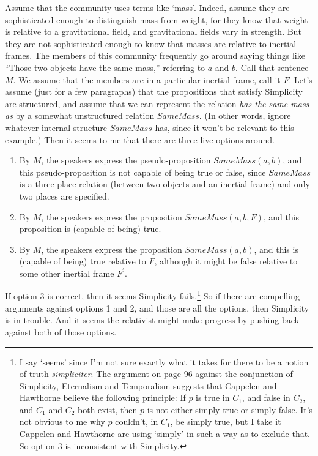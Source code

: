 Assume that the community uses terms like `mass'. Indeed, assume they are sophisticated enough to distinguish mass from weight, for they know that weight is relative to a gravitational field, and gravitational fields vary in strength. But they are not sophisticated enough to know that masses are relative to inertial frames. The members of this community frequently go around saying things like ``Those two objects have the same mass,'' referring to $a$ and $b$. Call that sentence $M$. We assume that the members are in a particular inertial frame, call it $F$. Let's assume (just for a few paragraphs) that the propositions that satisfy Simplicity are structured, and assume that we can represent the relation \textit{has the same mass as} by a somewhat unstructured relation $SameMass$. (In other words, ignore whatever internal structure $SameMass$ has, since it won't be relevant to this example.) Then it seems to me that there are three live options around.

\begin{enumerate}
\item By $M$, the speakers express the pseudo-proposition $SameMass(a, b)$, and this pseudo-proposition is not capable of being true or false, since $SameMass$ is a three-place relation (between two objects and an inertial frame) and only two places are specified.
\item By $M$, the speakers express the proposition $SameMass(a, b, F)$, and this proposition is (capable of being) true.
\item By $M$, the speakers express the proposition $SameMass(a, b)$, and this is (capable of being) true relative to $F$, although it might be false relative to some other inertial frame $F^{\prime}$.
\end{enumerate}

\noindent If option 3 is correct, then it seems Simplicity fails.\footnote{I say `seems' since I'm not sure exactly what it takes for there to be a notion of truth \textit{simpliciter}. The argument on page 96 against the conjunction of Simplicity, Eternalism and Temporalism suggests that Cappelen and Hawthorne believe the following principle: If $p$ is true in $C_1$, and false in $C_2$, and $C_1$ and $C_2$ both exist, then $p$ is not either simply true or simply false. It's not obvious to me why $p$ couldn't, in $C_1$, be simply true, but I take it Cappelen and Hawthorne are using `simply' in such a way as to exclude that. So option 3 is inconsistent with Simplicity.} So if there are compelling arguments against options 1 and 2, and those are all the options, then Simplicity is in trouble. And it seems the relativist might make progress by pushing back against both of those options.

